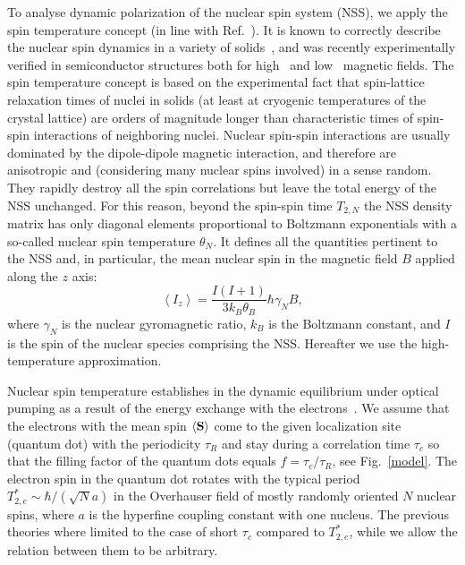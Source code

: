\documentclass[prl,nobibnotes,twocolumn,aps,longbibliography,superscriptaddress,notoc]{revtex4-1}
\newcommand{\braket}[1]{\left\langle #1 \right\rangle}
\begin{document}
To analyse dynamic polarization of the nuclear spin system (NSS), we apply the spin temperature concept (in line with Ref.~). It is known to correctly describe the nuclear spin dynamics in a variety of solids~\cite{goldman1970spin}, and was recently experimentally verified in semiconductor structures both for high~\cite{Chekhovich_constants} and low~\cite{PhysRevB.97.041301} magnetic fields. The spin temperature concept is based on the experimental fact that spin-lattice relaxation times of nuclei in solids (at least at cryogenic temperatures of the crystal lattice) are orders of magnitude longer than characteristic times of spin-spin interactions of neighboring nuclei. Nuclear spin-spin interactions are usually dominated by the dipole-dipole magnetic interaction, and therefore are anisotropic and (considering many nuclear spins involved) in a sense random. They rapidly destroy all the spin correlations but leave the total energy of the NSS unchanged. For this reason, beyond the spin-spin time $T_{2,N}$ the NSS density matrix has only diagonal elements proportional to Boltzmann exponentials with a so-called nuclear spin temperature $\theta_N$. It defines all the quantities pertinent to the NSS and, in particular, the mean nuclear spin in the magnetic field $B$ applied along the $z$ axis:
\begin{equation}
  \label{eq:P_N}
  \braket{I_z}=\frac{I(I+1)}{3k_B\theta_B}\hbar\gamma_NB,
\end{equation}
where $\gamma_N$ is the nuclear gyromagnetic ratio, $k_B$ is the Boltzmann constant, and $I$ is the spin of the nuclear species comprising the NSS. Hereafter we use the high-temperature approximation.

Nuclear spin temperature establishes in the dynamic equilibrium under optical pumping as a result of the energy exchange with the electrons~\cite{OptOrCh5}. We assume that the electrons with the mean spin $\braket{\bf{S}}$ come to the given localization site (quantum dot) with the periodicity $\tau_R$ and stay during a correlation time $\tau_c$ so that the filling factor of the quantum dots equals $f=\tau_c/\tau_R$, see Fig.~\ref{model}. The electron spin in the quantum dot rotates with the typical period $T_{2,e}^*\sim\hbar/(\sqrt{N}a)$ in the Overhauser field of mostly randomly oriented $N$ nuclear spins, where $a$ is the hyperfine coupling constant with one nucleus. The previous theories where limited to the case of short $\tau_c$ compared to $T_{2,e}^*$, while we allow the relation between them to be arbitrary.
\end{document}

